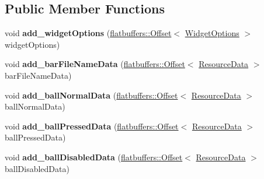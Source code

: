 \subsection*{Public Member Functions}
\begin{DoxyCompactItemize}
\item 
\mbox{\label{structflatbuffers_1_1SliderOptionsBuilder_adc2744e8747b3c8b7cb0af41c4c10aab}} 
void {\bfseries add\+\_\+widget\+Options} (\hyperlink{structflatbuffers_1_1Offset}{flatbuffers\+::\+Offset}$<$ \hyperlink{structflatbuffers_1_1WidgetOptions}{Widget\+Options} $>$ widget\+Options)
\item 
\mbox{\label{structflatbuffers_1_1SliderOptionsBuilder_a8ff55629da1f60cdc4b0ae3f970dd95d}} 
void {\bfseries add\+\_\+bar\+File\+Name\+Data} (\hyperlink{structflatbuffers_1_1Offset}{flatbuffers\+::\+Offset}$<$ \hyperlink{structflatbuffers_1_1ResourceData}{Resource\+Data} $>$ bar\+File\+Name\+Data)
\item 
\mbox{\label{structflatbuffers_1_1SliderOptionsBuilder_a9fd6a03716d40438d1184e5ba3fe62ea}} 
void {\bfseries add\+\_\+ball\+Normal\+Data} (\hyperlink{structflatbuffers_1_1Offset}{flatbuffers\+::\+Offset}$<$ \hyperlink{structflatbuffers_1_1ResourceData}{Resource\+Data} $>$ ball\+Normal\+Data)
\item 
\mbox{\label{structflatbuffers_1_1SliderOptionsBuilder_aa6d13491d9db35d2c337a6637cc76ab3}} 
void {\bfseries add\+\_\+ball\+Pressed\+Data} (\hyperlink{structflatbuffers_1_1Offset}{flatbuffers\+::\+Offset}$<$ \hyperlink{structflatbuffers_1_1ResourceData}{Resource\+Data} $>$ ball\+Pressed\+Data)
\item 
\mbox{\label{structflatbuffers_1_1SliderOptionsBuilder_a1cc268a9d49e3cf2967ff332a49065b6}} 
void {\bfseries add\+\_\+ball\+Disabled\+Data} (\hyperlink{structflatbuffers_1_1Offset}{flatbuffers\+::\+Offset}$<$ \hyperlink{structflatbuffers_1_1ResourceData}{Resource\+Data} $>$ ball\+Disabled\+Data)
\item 
\mbox{\label{structflatbuffers_1_1SliderOptionsBuilder_a78fba9fc0a9da2f8c44310f3a9c22cd3}} 

\end{DoxyCompactItemize}
